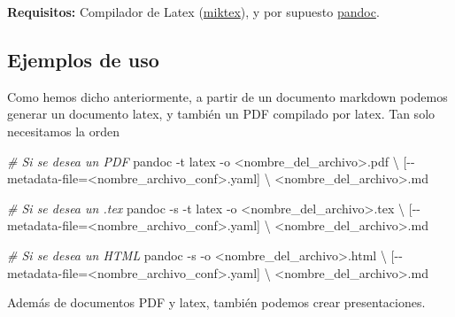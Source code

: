 \documentclass[
  spanish,
]{article}
\newenvironment{Shaded}{}{}
\newcommand{\AttributeTok}[1]{\textcolor[rgb]{0.49,0.56,0.16}{#1}}
\newcommand{\CommentTok}[1]{\textcolor[rgb]{0.38,0.63,0.69}{\textit{#1}}}
\newcommand{\DataTypeTok}[1]{\textcolor[rgb]{0.56,0.13,0.00}{#1}}
\newcommand{\ExtensionTok}[1]{#1}
\newcommand{\NormalTok}[1]{#1}
\newcommand{\OperatorTok}[1]{\textcolor[rgb]{0.40,0.40,0.40}{#1}}
\begin{document}
\textbf{Requisitos:} Compilador de Latex
(\href{https://miktex.org/}{miktex}), y por supuesto
\href{https://pandoc.org/installing.html}{pandoc}.

\subsection{Ejemplos de uso}\label{ejemplos-de-uso}

Como hemos dicho anteriormente, a partir de un documento markdown
podemos generar un documento latex, y también un PDF compilado por
latex. Tan solo necesitamos la orden

\begin{Shaded}
\begin{Highlighting}[]
\CommentTok{\# Si se desea un PDF}
\ExtensionTok{pandoc} \AttributeTok{{-}t}\NormalTok{ latex }\AttributeTok{{-}o} \OperatorTok{\textless{}}\NormalTok{nombre\_del\_archivo}\OperatorTok{\textgreater{}}\NormalTok{.pdf }\DataTypeTok{\textbackslash{}}
\NormalTok{    [{-}{-}metadata{-}file=}\OperatorTok{\textless{}}\NormalTok{nombre\_archivo\_conf}\OperatorTok{\textgreater{}}\NormalTok{.yaml] }\DataTypeTok{\textbackslash{}}
    \OperatorTok{\textless{}}\NormalTok{nombre\_del\_archivo}\OperatorTok{\textgreater{}}\NormalTok{.md}

\CommentTok{\# Si se desea un .tex  }
\ExtensionTok{pandoc} \AttributeTok{{-}s} \AttributeTok{{-}t}\NormalTok{ latex }\AttributeTok{{-}o} \OperatorTok{\textless{}}\NormalTok{nombre\_del\_archivo}\OperatorTok{\textgreater{}}\NormalTok{.tex }\DataTypeTok{\textbackslash{}}
\NormalTok{    [{-}{-}metadata{-}file=}\OperatorTok{\textless{}}\NormalTok{nombre\_archivo\_conf}\OperatorTok{\textgreater{}}\NormalTok{.yaml] }\DataTypeTok{\textbackslash{}}
    \OperatorTok{\textless{}}\NormalTok{nombre\_del\_archivo}\OperatorTok{\textgreater{}}\NormalTok{.md}
\end{Highlighting}
\end{Shaded}

\begin{Shaded}
\begin{Highlighting}[]
\CommentTok{\# Si se desea un HTML}
\ExtensionTok{pandoc} \AttributeTok{{-}s} \AttributeTok{{-}o} \OperatorTok{\textless{}}\NormalTok{nombre\_del\_archivo}\OperatorTok{\textgreater{}}\NormalTok{.html }\DataTypeTok{\textbackslash{}}
\NormalTok{    [{-}{-}metadata{-}file=}\OperatorTok{\textless{}}\NormalTok{nombre\_archivo\_conf}\OperatorTok{\textgreater{}}\NormalTok{.yaml] }\DataTypeTok{\textbackslash{}}
    \OperatorTok{\textless{}}\NormalTok{nombre\_del\_archivo}\OperatorTok{\textgreater{}}\NormalTok{.md}
\end{Highlighting}
\end{Shaded}

Además de documentos PDF y latex, también podemos crear presentaciones.
\end{document}
